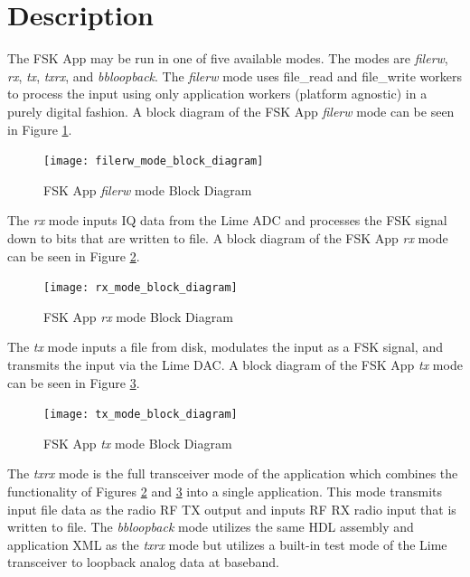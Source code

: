 \section{Description}
The FSK App may be run in one of five available modes. The modes are \textit{filerw}, \textit{rx}, \textit{tx}, \textit{txrx}, and \textit{bbloopback}. The \textit{filerw} mode uses file\_read and file\_write workers to process the input using only application workers (platform agnostic) in a purely digital fashion. A block diagram of the FSK App \textit{filerw} mode can be seen in Figure \ref{fig:filerw_mode_block_diagram}.
	\begin{figure}[H]
	 	\centering
		\texttt{[image: filerw\_mode\_block\_diagram]}
		\caption{FSK App \textit{filerw} mode Block Diagram}
		\label{fig:filerw_mode_block_diagram}
	\end{figure}

\newpage
\noindent The \textit{rx} mode inputs IQ data from the Lime ADC and processes the FSK signal down to bits that are written to file. A block diagram of the FSK App \textit{rx} mode can be seen in Figure \ref{fig:rx_mode_block_diagram}.\par\medskip
	\begin{figure}[H]
	 	\centering
		\texttt{[image: rx\_mode\_block\_diagram]}
		\caption{FSK App \textit{rx} mode Block Diagram}
		\label{fig:rx_mode_block_diagram}
	\end{figure}

\noindent The \textit{tx} mode inputs a file from disk, modulates the input as a FSK signal, and transmits the input via the Lime DAC. A block diagram of the FSK App \textit{tx} mode can be seen in Figure \ref{fig:tx_mode_block_diagram}.
	\begin{figure}[H]
	 	\centering
		\texttt{[image: tx\_mode\_block\_diagram]}
		\caption{FSK App \textit{tx} mode Block Diagram}
		\label{fig:tx_mode_block_diagram}
	\end{figure}

\noindent The \textit{txrx} mode is the full transceiver mode of the application which combines the functionality of Figures \ref{fig:rx_mode_block_diagram} and \ref{fig:tx_mode_block_diagram} into a single application. This mode transmits input file data as the radio RF TX output and inputs RF RX radio input that is written to file. The \textit{bbloopback} mode utilizes the same HDL assembly and application XML as the \textit{txrx} mode but utilizes a built-in test mode of the Lime transceiver to loopback analog data at baseband.\par\medskip

